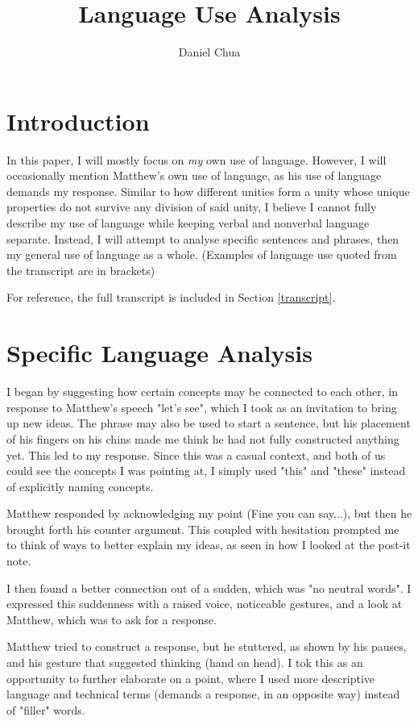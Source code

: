\documentclass[12pt]{article}
\author{Daniel Chua}
\title{Language Use Analysis}
\begin{document}
\maketitle

\section{Introduction}

In this paper, I will mostly focus on \textit{my} own use of language. However, I will occasionally mention Matthew's own use of language, as his use of language demands my response. Similar to how different unities form a unity whose unique properties do not survive any division of said unity, I believe I cannot fully describe my use of language while keeping verbal and nonverbal language separate. Instead, I will attempt to analyse specific sentences and phrases, then my general use of language as a whole. (Examples of language use quoted from the transcript are in brackets)

For reference, the full transcript is included in Section \ref{transcript}.

\section{Specific Language Analysis}

I began by suggesting how certain concepts may be connected to each other, in response to Matthew's speech "let's see", which I took as an invitation to bring up new ideas. The phrase may also be used to start a sentence, but his placement of his fingers on his chins made me think he had not fully constructed anything yet. This led to my response. Since this was a casual context, and both of us could see the concepts I was pointing at, I simply used "this" and "these" instead of explicitly naming concepts.

Matthew responded by acknowledging my point (Fine you can say...), but then he brought forth his counter argument. This coupled with hesitation prompted me to think of ways to better explain my ideas, as seen in how I looked at the post-it note.

I then found a better connection out of a sudden, which was "no neutral words". I expressed this suddenness with a raised voice, noticeable gestures, and a look at Matthew, which was to ask for a response.

Matthew tried to construct a response, but he stuttered, as shown by his pauses, and his gesture that suggested thinking (hand on head). I tok this as an opportunity to further elaborate on a point, where I used more descriptive language and technical terms (demands a response, in an opposite way) instead of "filler" words.
\end{document}
